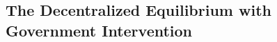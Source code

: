 \documentclass[12pt,pdftex]{article}
\begin{document}
\begin{onehalfspacing}
%
%
%




\section{The Decentralized Equilibrium with Government Intervention}


\end{onehalfspacing}
\end{document}
